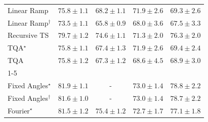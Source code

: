 \begin{tabular}{l|cccc|}
Linear Ramp & {\cellcolor[HTML]{ED7215}} \color[HTML]{F1F1F1} $75.8\pm 1.1$ & {\cellcolor[HTML]{FFF4B5}} \color[HTML]{000000} $68.2\pm 1.1$ & {\cellcolor[HTML]{FEC34F}} \color[HTML]{000000} $71.9\pm 2.6$ & {\cellcolor[HTML]{FEE89D}} \color[HTML]{000000} $69.3\pm 2.6$ \\
Linear Ramp$^\dagger$ & {\cellcolor[HTML]{FEA231}} \color[HTML]{000000} $73.5\pm 1.1$ & {\cellcolor[HTML]{FFFFE5}} \color[HTML]{000000} $65.8\pm 0.9$ & {\cellcolor[HTML]{FFF6B9}} \color[HTML]{000000} $68.0\pm 3.6$ & {\cellcolor[HTML]{FFF8C4}} \color[HTML]{000000} $67.5\pm 3.3$ \\
Recursive TS & {\cellcolor[HTML]{A03704}} \color[HTML]{F1F1F1} $79.7\pm 1.2$ & {\cellcolor[HTML]{F88A21}} \color[HTML]{F1F1F1} $74.6\pm 1.1$ & {\cellcolor[HTML]{FECD63}} \color[HTML]{000000} $71.3\pm 2.0$ & {\cellcolor[HTML]{E66A11}} \color[HTML]{F1F1F1} $76.3\pm 2.0$ \\
TQA$^\star$ & {\cellcolor[HTML]{ED7215}} \color[HTML]{F1F1F1} $75.8\pm 1.1$ & {\cellcolor[HTML]{FFF9C5}} \color[HTML]{000000} $67.4\pm 1.3$ & {\cellcolor[HTML]{FEC34F}} \color[HTML]{000000} $71.9\pm 2.6$ & {\cellcolor[HTML]{FEE89B}} \color[HTML]{000000} $69.4\pm 2.4$ \\
TQA & {\cellcolor[HTML]{ED7215}} \color[HTML]{F1F1F1} $75.8\pm 1.2$ & {\cellcolor[HTML]{FFF9C7}} \color[HTML]{000000} $67.3\pm 1.2$ & {\cellcolor[HTML]{FFEFAC}} \color[HTML]{000000} $68.6\pm 4.5$ & {\cellcolor[HTML]{FEEDA6}} \color[HTML]{000000} $68.9\pm 3.0$ \\
\cline{1-5}
\multicolumn{5}{c}{\rule{0pt}{8pt}PP} \\
\midrule
Fixed Angles$^\star$ & {\cellcolor[HTML]{004629}} \color[HTML]{F1F1F1} $81.9\pm 1.1$ & {\cellcolor[HTML]{000000}} \color[HTML]{F1F1F1} {\cellcolor{white}} \color{black} - & {\cellcolor[HTML]{90D083}} \color[HTML]{000000} $73.0\pm 1.4$ & {\cellcolor[HTML]{14783E}} \color[HTML]{F1F1F1} $78.8\pm 2.2$ \\
Fixed Angles$^\dagger$ & {\cellcolor[HTML]{004C2C}} \color[HTML]{F1F1F1} $81.6\pm 1.0$ & {\cellcolor[HTML]{000000}} \color[HTML]{F1F1F1} {\cellcolor{white}} \color{black} - & {\cellcolor[HTML]{90D083}} \color[HTML]{000000} $73.0\pm 1.4$ & {\cellcolor[HTML]{167A3F}} \color[HTML]{F1F1F1} $78.7\pm 2.2$ \\
Fourier$^\star$ & {\cellcolor[HTML]{004D2C}} \color[HTML]{F1F1F1} $81.5\pm 1.2$ & {\cellcolor[HTML]{4FB264}} \color[HTML]{F1F1F1} $75.4\pm 1.2$ & {\cellcolor[HTML]{97D385}} \color[HTML]{000000} $72.7\pm 1.7$ & {\cellcolor[HTML]{2F944E}} \color[HTML]{F1F1F1} $77.1\pm 1.8$ \\

\end{tabular}
